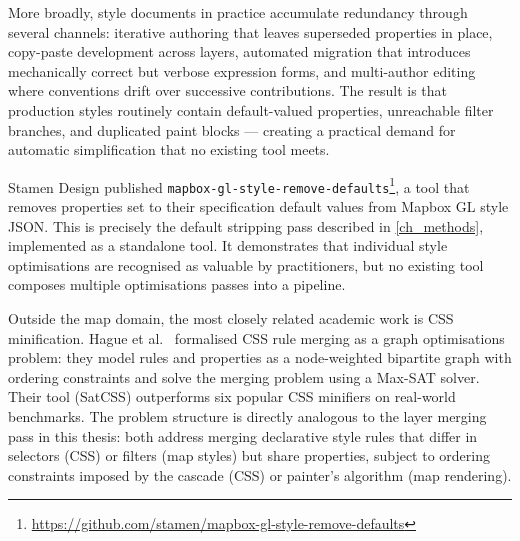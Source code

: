 More broadly, style documents in practice accumulate redundancy through several channels: iterative authoring that leaves superseded properties in place, copy-paste development across layers, automated migration that introduces mechanically correct but verbose expression forms, and multi-author editing where conventions drift over successive contributions.
The result is that production styles routinely contain default-valued properties, unreachable filter branches, and duplicated paint blocks --- creating a practical demand for automatic simplification that no existing tool meets.

Stamen Design published \texttt{mapbox-gl-style-remove-defaults}\footnote{\url{https://github.com/stamen/mapbox-gl-style-remove-defaults}}, a tool that removes properties set to their specification default values from Mapbox GL style JSON.
This is precisely the default stripping pass described in \cref{ch_methods}, implemented as a standalone tool.
It demonstrates that individual style optimisations are recognised as valuable by practitioners, but no existing tool composes multiple optimisations passes into a pipeline.

Outside the map domain, the most closely related academic work is CSS minification.
Hague et al.~\cite{hagueCSSMinificationConstraint2019} formalised CSS rule merging as a graph optimisations problem: they model rules and properties as a node-weighted bipartite graph with ordering constraints and solve the merging problem using a Max-SAT solver.
Their tool (SatCSS) outperforms six popular CSS minifiers on real-world benchmarks.
The problem structure is directly analogous to the layer merging pass in this thesis: both address merging declarative style rules that differ in selectors (CSS) or filters (map styles) but share properties, subject to ordering constraints imposed by the cascade (CSS) or painter's algorithm (map rendering).

